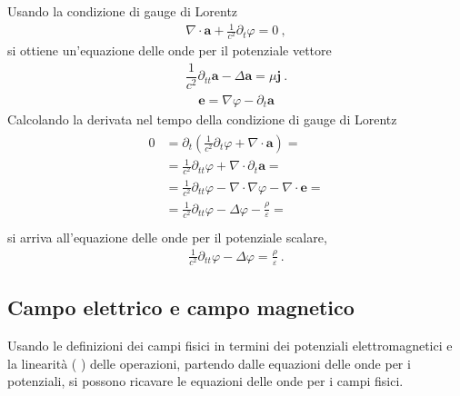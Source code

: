\documentclass[letterpaper,10pt,italian]{jupyterBook}
\begin{document}
\sphinxAtStartPar
Usando la condizione di gauge di Lorentz
\begin{equation*}
\begin{split}\nabla \cdot \mathbf{a} + \frac{1}{c^2} \partial_t  \varphi = 0 \ ,\end{split}
\end{equation*}
\sphinxAtStartPar
si ottiene un’equazione delle onde per il potenziale vettore
\begin{equation*}
\begin{split} \dfrac{1}{c^2} \partial_{tt} \mathbf{a} - \Delta \mathbf{a}  =  \mu \mathbf{j}  \ .\end{split}
\end{equation*}
\sphinxAtStartPar
{}
\begin{equation*}
\begin{split}\mathbf{e} = \nabla \varphi - \partial_t \mathbf{a}\end{split}
\end{equation*}
\sphinxAtStartPar
Calcolando la derivata nel tempo della condizione di gauge di Lorentz
\begin{equation*}
\begin{split}\begin{aligned}
 0 & = \partial_t (\frac{1}{c^2} \partial_t \varphi + \nabla \cdot \mathbf{a}) = \\
   & = \frac{1}{c^2} \partial_{tt} \varphi + \nabla \cdot \partial_t \mathbf{a} = \\
   & = \frac{1}{c^2} \partial_{tt} \varphi - \nabla \cdot \nabla \varphi - \nabla \cdot \mathbf{e} = \\
   & = \frac{1}{c^2} \partial_{tt} \varphi - \Delta \varphi - \frac{\rho}{\varepsilon} = \\
\end{aligned}\end{split}
\end{equation*}
\sphinxAtStartPar
si arriva all’equazione delle onde per il potenziale scalare,
\begin{equation*}
\begin{split} \frac{1}{c^2} \partial_{tt} \varphi - \Delta \varphi = \frac{\rho}{\varepsilon} \ .\end{split}
\end{equation*}

\subsection{Campo elettrico e campo magnetico}
\label{\detokenize{ch/waves-equation:campo-elettrico-e-campo-magnetico}}
\sphinxAtStartPar
Usando le definizioni dei campi fisici in termini dei potenziali elettromagnetici e la linearità ( ) delle operazioni, partendo dalle equazioni delle onde per i potenziali, si possono ricavare le equazioni delle onde per i campi fisici.  
\end{document}
